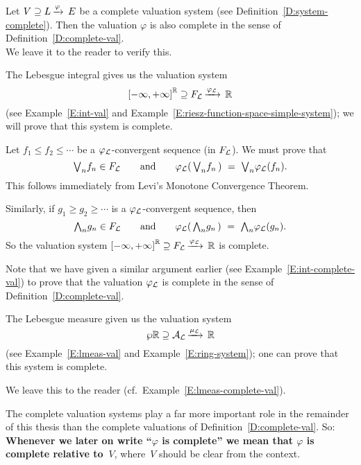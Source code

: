 \documentclass[main.tex]{subfiles}
\begin{document}
%
%
\begin{rem}
Let $V \supseteq L\,\smash{\xrightarrow{\varphi}\,E}$ be a complete valuation
system
(see Definition~\ref{D:system-complete}).
Then the valuation $\varphi$
is also complete in the sense
of Definition~\ref{D:complete-val}.\\
We leave it to the reader to verify this.
\end{rem}
%
%
\begin{ex}
\label{E:complete-lint}
The Lebesgue integral
gives us the   valuation system
\begin{equation*}
{[-\infty,+\infty]}^{\mathbb{R}} \supseteq F_{\mathcal{L}}\,\smash{\xrightarrow{\varphi_{\mathcal{L}}}\,\mathbb{R}}
\end{equation*}
(see Example~\ref{E:int-val} and
Example~\ref{E:riesz-function-space-simple-system});
we will prove that this system is complete.

Let $f_1 \leq f_2 \leq \dotsb$
be a $\varphi_{\mathcal{L}}$-convergent sequence (in $F_{\mathcal{L}}$).
We must prove that 
\begin{equation*}
\textstyle{\bigvee}_n f_n \in F_{\mathcal{L}}
\qquad\text{and}\qquad\varphi_{\mathcal{L}}(\,\textstyle{\bigvee}_n f_n\,) \ =\  \textstyle{\bigvee}_n \varphi_{\mathcal{L}} (f_n).
\end{equation*}
This follows immediately from Levi's Monotone Convergence Theorem.

Similarly,
if $g_1 \geq g_2 \geq \dotsb$
is a $\varphi_{\mathcal{L}}$-convergent sequence,
then
\begin{equation*}
\textstyle{\bigwedge}_n g_n \in F_{\mathcal{L}}
\qquad\text{and}\qquad\varphi_{\mathcal{L}}(\,\textstyle{\bigwedge}_n g_n\,) \ =\  \textstyle{\bigwedge}_n \varphi_{\mathcal{L}} (g_n).
\end{equation*}
So the  valuation system ${[-\infty,+\infty]}^{\mathbb{R}} \supseteq F_{\mathcal{L}}\,\smash{\xrightarrow{\varphi_{\mathcal{L}}}\,\mathbb{R}}$ is complete.

Note that we have given a similar argument earlier 
(see Example~\ref{E:int-complete-val}) to prove
that the valuation $\varphi_{\mathcal{L}}$
is complete in the sense of Definition~\ref{D:complete-val}.
\end{ex}
%
%
\begin{ex}
\label{E:complete-lmeas}
The Lebesgue measure
given us the   valuation system
\begin{equation*}
\wp{\mathbb{R}} \supseteq \mathcal{A}_{\mathcal{L}}\,\smash{\xrightarrow{\mu_{\mathcal{L}}}\,\mathbb{R}}
\end{equation*}
(see Example~\ref{E:lmeas-val} and
Example~\ref{E:ring-system});
one can prove that this system is complete.

We leave this to the reader (cf.~Example~\ref{E:lmeas-complete-val}).
\end{ex}
%
%
%
\noindent
\begin{cnv}
The complete valuation systems play a far more important
role in the remainder of this thesis
than the complete valuations of Definition~\ref{D:complete-val}.
So:\\
\textbf{Whenever we later on write ``$\varphi$ is complete'' 
we mean that  $\varphi$ is complete relative to~$V$},
where~$V$ should be clear from the context.
\end{cnv}
\end{document}
